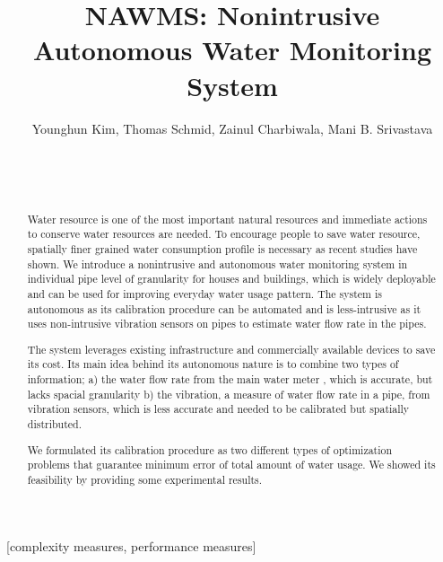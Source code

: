 \documentclass[10pt]{sigplan-proc-varsize}
\author{
      \alignauthor Younghun Kim, Thomas Schmid, Zainul Charbiwala, Mani B. Srivastava   \\  
%
%
%
      \sharedaffiliation
     \affaddr{Networked and Embedded Systems Lab.}  \\
     \affaddr{Electrical Engineering Department}  \\
      \affaddr{University of California, Los Angeles}\\
      \email{\{kimyh,thomas.schmid,zainul,mbs\}@ucla.edu}
    }
\title{NAWMS: Nonintrusive Autonomous Water Monitoring System}
\begin{document}
\maketitle


\begin{abstract}
Water resource is one of the most important natural resources and immediate actions to conserve water resources are needed. To encourage people to save water resource, spatially finer grained water consumption profile is necessary as recent studies have shown. We introduce a nonintrusive and autonomous water monitoring system in individual pipe level of granularity for houses and buildings, which is widely deployable and can be used for improving everyday water usage pattern. The system is autonomous as its calibration procedure can be automated and is less-intrusive as it uses non-intrusive vibration sensors on pipes to estimate water flow rate in the pipes.

The system leverages existing infrastructure and commercially available devices to save its cost. Its main idea behind its autonomous nature is to combine two types of information; a) the water flow rate from the main water meter , which is accurate, but lacks spacial granularity b) the vibration, a measure of water flow rate in a pipe, from vibration sensors, which is less accurate and needed to be calibrated but spatially distributed.

We formulated its calibration procedure as two different types of optimization problems that guarantee minimum error of total amount of water usage. We showed its feasibility by providing some experimental results.

\end{abstract}

[complexity measures, performance measures]



















\end{document}
